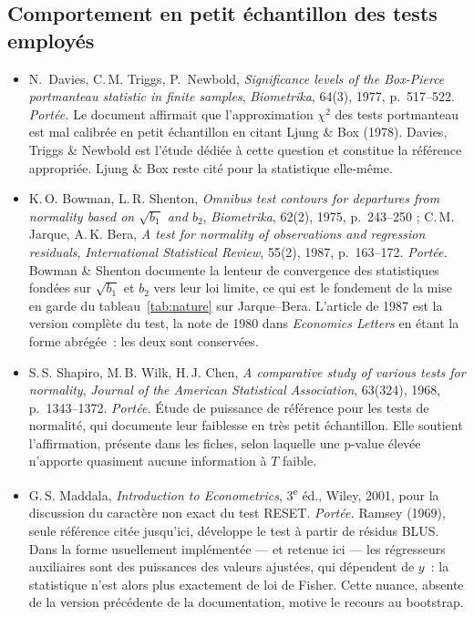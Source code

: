 \documentclass[a4paper,11pt]{article}
\begin{document}
\subsection*{Comportement en petit échantillon des tests employés}

\begin{itemize}[itemsep=4pt]
  \item N.~Davies, C.\,M. Triggs, P.~Newbold, \emph{Significance levels of the
  Box-Pierce portmanteau statistic in finite samples}, \emph{Biometrika}, 64(3),
  1977, p.~517--522.
  \emph{Portée.} Le document affirmait que l'approximation
  $\chi^2$ des tests portmanteau est mal calibrée en petit échantillon en
  citant Ljung \& Box (1978). Davies, Triggs \& Newbold est l'étude dédiée à
  cette question et constitue la référence appropriée. Ljung \& Box reste cité
  pour la statistique elle-même.

  \item K.\,O. Bowman, L.\,R. Shenton, \emph{Omnibus test contours for
  departures from normality based on $\sqrt{b_1}$ and $b_2$},
  \emph{Biometrika}, 62(2), 1975, p.~243--250 ; C.\,M. Jarque, A.\,K. Bera,
  \emph{A test for normality of observations and regression residuals},
  \emph{International Statistical Review}, 55(2), 1987, p.~163--172.
  \emph{Portée.} Bowman \& Shenton documente la lenteur de
  convergence des statistiques fondées sur $\sqrt{b_1}$ et $b_2$ vers leur loi
  limite, ce qui est le fondement de la mise en garde du
  tableau~\ref{tab:nature} sur Jarque--Bera. L'article de 1987 est la version
  complète du test, la note de 1980 dans \emph{Economics Letters} en étant la
  forme abrégée~: les deux sont conservées.

  \item S.\,S. Shapiro, M.\,B. Wilk, H.\,J. Chen, \emph{A comparative study of
  various tests for normality}, \emph{Journal of the American Statistical
  Association}, 63(324), 1968, p.~1343--1372.
  \emph{Portée.} Étude de puissance de référence pour les tests de
  normalité, qui documente leur faiblesse en très petit échantillon. Elle
  soutient l'affirmation, présente dans les fiches, selon laquelle une p-value
  élevée n'apporte quasiment aucune information à $T$ faible.

  \item G.\,S. Maddala, \emph{Introduction to Econometrics}, 3\textsuperscript{e}
  éd., Wiley, 2001, pour la discussion du caractère non exact du test RESET.
  \emph{Portée.} Ramsey (1969), seule référence citée jusqu'ici,
  développe le test à partir de résidus BLUS. Dans la forme usuellement
  implémentée --- et retenue ici --- les régresseurs auxiliaires sont des
  puissances des valeurs ajustées, qui dépendent de $y$~: la statistique n'est
  alors plus exactement de loi de Fisher. Cette nuance, absente de la version
  précédente de la documentation, motive le recours au bootstrap.


\end{itemize}
\end{document}
